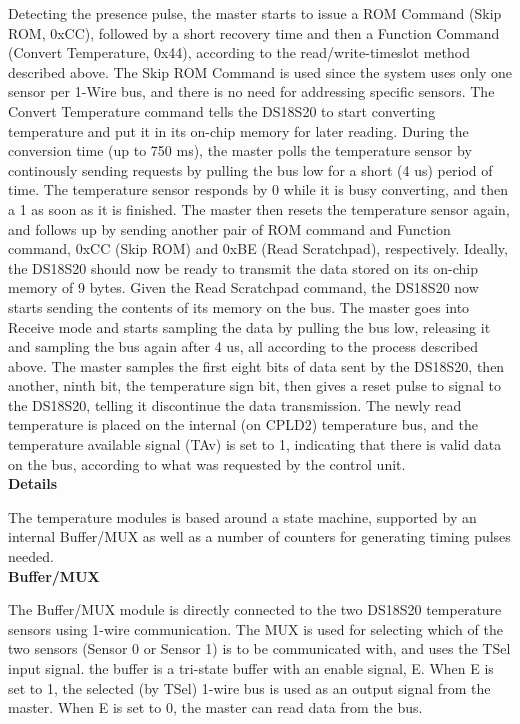 \documentclass[a4paper,11pt]{article}
\begin{document}
Detecting the presence pulse, the master starts to issue a ROM Command (Skip ROM, 0xCC), followed
by a short recovery time and then a Function Command (Convert Temperature, 0x44), according to the
read/write-timeslot method described above. The Skip ROM Command is used since the system uses only
one sensor per 1-Wire bus, and there is no need for addressing specific sensors. The Convert Temperature
command tells the DS18S20 to start converting temperature and put it in its on-chip memory for later reading.
During the conversion time (up to 750 ms), the master polls the temperature sensor by continously sending
requests by pulling the bus low for a short (4 us) period of time. The temperature sensor responds by
0 while it is busy converting, and then a 1 as soon as it is finished.
The master then resets the temperature sensor again, and follows up by sending another pair of ROM command
and Function command, 0xCC (Skip ROM) and 0xBE (Read Scratchpad), respectively. 
Ideally, the DS18S20 should now be ready to transmit the data stored on its on-chip memory of
9 bytes. Given the Read Scratchpad command, the DS18S20 now starts sending the contents of its memory
on the bus. The master goes into Receive mode and starts sampling the data by pulling the bus low,
releasing it and sampling the bus again after 4 us, all according to the process described above.
The master samples the first eight bits of data sent by the DS18S20, then another, ninth bit, the temperature sign bit, 
then gives a reset pulse to signal to the DS18S20, telling it discontinue the data transmission. 
The newly read temperature is placed on the internal (on CPLD2) temperature bus, and the temperature available signal 
(TAv) is set to 1, indicating that there is valid data on the bus, according to what was requested by the control unit.\\

{\noindent \bf Details}

The temperature modules is based around a state machine, supported by an internal Buffer/MUX as well
as a number of counters for generating timing pulses needed. \\

{\noindent \bf Buffer/MUX}

The Buffer/MUX module is directly connected to the two DS18S20 temperature sensors using 1-wire communication. The MUX is used for selecting
which of the two sensors (Sensor 0 or Sensor 1) is to be communicated with, and uses the TSel input signal.
the buffer is a tri-state buffer with an enable signal, E. When E is set to 1, the selected (by TSel) 1-wire bus
is used as an output signal from the master. When E is set to 0, the master can read data from the bus.\\
\end{document}
